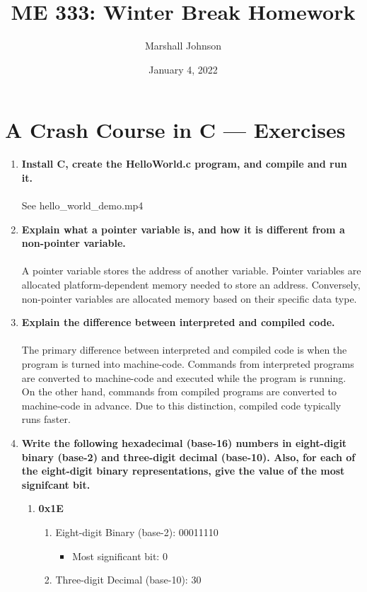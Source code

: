 \documentclass{article}
\title{ME 333: Winter Break Homework}
\author{Marshall Johnson}
\date{January 4, 2022}
\begin{document}
\maketitle

\section*{A Crash Course in C --- Exercises}
\begin{enumerate}[label=\textbf{\arabic*})]
    \item  \textbf{Install C, create the HelloWorld.c program, and compile and run it.} \\ 
    \\
    See hello\_world\_demo.mp4
    \item \textbf{Explain what a pointer variable is, and how it is different from a non-pointer variable.} \\ 
    \\
    A pointer variable stores the address of another variable. Pointer variables are allocated platform-dependent memory needed to store an address. Conversely, non-pointer variables are allocated memory based on their specific data type.
    \item \textbf{Explain the difference between interpreted and compiled code.} \\
    \\
    The primary difference between interpreted and compiled code is when the program is turned into machine-code. Commands from interpreted programs are converted to machine-code and executed while the program is running. On the other hand, commands from compiled programs are converted to machine-code in advance. Due to this distinction, compiled code typically runs faster.
    \item \textbf{Write the following hexadecimal (base-16) numbers in eight-digit binary (base-2) and three-digit decimal (base-10). Also, for each of the eight-digit binary representations, give the value of the most signifcant bit.}
    
    \begin{enumerate}[label=\textbf{\alph*}.]
        \item \textbf{0x1E}
        \begin{enumerate}
            \item Eight-digit Binary (base-2): 00011110
            \begin{itemize}
                \item Most significant bit: 0
            \end{itemize}
            \item Three-digit Decimal (base-10): 30
        \end{enumerate}
        

\end{enumerate}
\end{enumerate}
\end{document}
